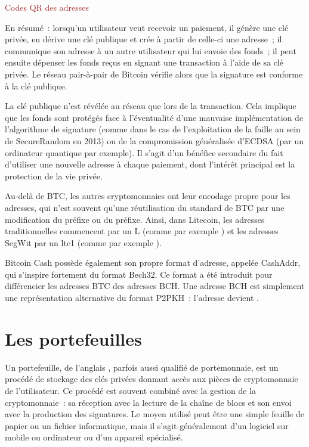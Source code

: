 \textcolor{brown}{Codes QR des adresses}

En résumé~: lorsqu'un utilisateur veut recevoir un paiement, il génère une clé privée, en dérive une clé publique et crée à partir de celle-ci une adresse~; il communique son adresse à un autre utilisateur qui lui envoie des fonds~; il peut ensuite dépenser les fonds reçus en signant une transaction à l'aide de sa clé privée. Le réseau pair-à-pair de Bitcoin vérifie alors que la signature est conforme à la clé publique. 

La clé publique n'est révélée au réseau que lors de la transaction. Cela implique que les fonds sont protégés face à l'éventualité d'une mauvaise implémentation de l'algorithme de signature (comme dans le cas de l'exploitation de la faille au sein de SecureRandom en 2013) ou de la compromission généralisée d'ECDSA (par un ordinateur quantique par exemple). Il s'agit d'un bénéfice secondaire du fait d'utiliser une nouvelle adresse à chaque paiement, dont l'intérêt principal est la protection de la vie privée.

Au-delà de BTC, les autres cryptomonnaies ont leur encodage propre pour les adresses, qui n'est souvent qu'une réutilisation du standard de BTC par une modification du préfixe ou du préfixe. Ainsi, dans Litecoin, les adresses traditionnelles commencent par un L (comme par exemple ) et les adresses SegWit par un ltc1 (comme par exemple ).

Bitcoin Cash possède également son propre format d'adresse, appelée CashAddr, qui s'inspire fortement du format Bech32. Ce format a été introduit pour différencier les adresses BTC des adresses BCH. Une adresse BCH est simplement une représentation alternative du format P2PKH~: l'adresse  devient .


\section{Les portefeuilles}


Un portefeuille, de l'anglais , parfois aussi qualifié de portemonnaie, est un procédé de stockage des clés privées donnant accès aux pièces de cryptomonnaie de l'utilisateur. Ce procédé est souvent combiné avec la gestion de la cryptomonnaie~: sa réception avec la lecture de la chaîne de blocs et son envoi avec la production des signatures. Le moyen utilisé peut être une simple feuille de papier ou un fichier informatique, mais il s'agit généralement d'un logiciel sur mobile ou ordinateur ou d'un appareil spécialisé.

